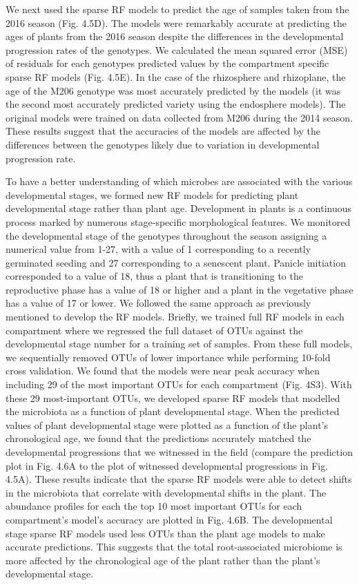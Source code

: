 We next used the sparse RF models to predict the age of samples taken from the 2016 season (Fig. 4.5D). The models were remarkably accurate at predicting the ages of plants from the 2016 season despite the differences in the developmental progression rates of the genotypes. We calculated the mean squared error (MSE) of residuals for each genotypes predicted values by the compartment specific sparse RF models (Fig. 4.5E). In the case of the rhizosphere and rhizoplane, the age of the M206 genotype was most accurately predicted by the models (it was the second most accurately predicted variety using the endosphere models). The original models were trained on data collected from M206 during the 2014 season. These results suggest that the accuracies of the models are affected by the differences between the genotypes likely due to variation in developmental progression rate. 

To have a better understanding of which microbes are associated with the various developmental stages, we formed new RF models for predicting plant developmental stage rather than plant age. Development in plants is a continuous process marked by numerous stage-specific morphological features. We monitored the developmental stage of the genotypes throughout the season assigning a numerical value from 1-27, with a value of 1 corresponding to a recently germinated seeding and 27 corresponding to a senescent plant. Panicle initiation corresponded to a value of 18, thus a plant that is transitioning to the reproductive phase has a value of 18 or higher and a plant in the vegetative phase has a value of 17 or lower. We followed the same approach as previously mentioned to develop the RF models. Briefly, we trained full RF models in each compartment where we regressed the full dataset of OTUs against the developmental stage number for a training set of samples. From these full models, we sequentially removed OTUs of lower importance while performing 10-fold cross validation. We found that the models were near peak accuracy when including 29 of the most important OTUs for each compartment (Fig. 4S3). With these 29 most-important OTUs, we developed sparse RF models that modelled the microbiota as a function of plant developmental stage. When the predicted values of plant developmental stage were plotted as a function of the plant's chronological age, we found that the predictions accurately matched the developmental progressions that we witnessed in the field (compare the prediction plot in Fig. 4.6A to the plot of witnessed developmental progressions in Fig. 4.5A). These results indicate that the sparse RF models were able to detect shifts in the microbiota that correlate with developmental shifts in the plant. The abundance profiles for each the top 10 most important OTUs for each compartment's model's accuracy are plotted in Fig. 4.6B. The developmental stage sparse RF models used less OTUs than the plant age models to make accurate predictions. This suggests that the total root-associated microbiome is more affected by the chronological age of the plant rather than the plant's developmental stage.

